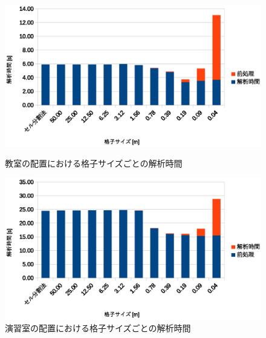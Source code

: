 \begin{figure}[tb]
	\begin{minipage}[b]{0.48\columnwidth}
		\begin{center}
		\includegraphics[width=\columnwidth]{figure/20231016_kyositu_time.eps}
		\caption{教室の配置における格子サイズごとの解析時間}
		\label{fig:kyositu_time}
		\end{center}
	\end{minipage}
	\hspace{0.04\columnwidth}
	\begin{minipage}[b]{0.48\columnwidth}
		\begin{center}
		\includegraphics[width=\columnwidth]{figure/20231016_pc_time.eps}
		\caption{演習室の配置における格子サイズごとの解析時間}
		\label{fig:pc_time}
		\end{center}
	\end{minipage}
\end{figure}
%

